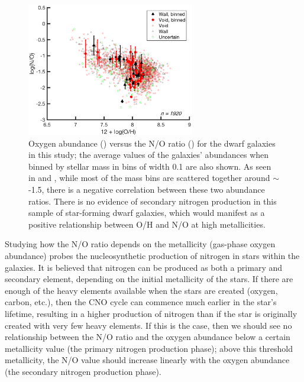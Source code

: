 \begin{figure}
    \centering
    \includegraphics[width=0.65\textwidth]{Images/Paper3/1sig_I06relations_dwarf_SF_t3_dust_NSA_Z12logOH_logNO_scatterMbin}
    \caption[O/H versus N/O for star-forming dwarf galaxies]{Oxygen abundance 
    (\OH) versus the N/O ratio (\NO) for the dwarf galaxies in this study; the 
    average values of the galaxies' abundances when binned by stellar mass in 
    bins of width 0.1 are also shown.  As seen in \cite{Andrews13} and 
    \cite{Douglass17b}, while most of the mass bins are scattered together 
    around \NO $\sim$-1.5, there is a negative correlation between these two 
    abundance ratios.  There is no evidence of secondary nitrogen production in 
    this sample of star-forming dwarf galaxies, which would manifest as a 
    positive relationship between O/H and N/O at high metallicities.}
    \label{fig:NOvOH}
\end{figure}

Studying how the N/O ratio depends on the metallicity (gas-phase oxygen 
abundance) probes the nucleosynthetic production of nitrogen in stars within the 
galaxies.  It is believed that nitrogen can be produced as both a primary and 
secondary element, depending on the initial metallicity of the stars.  If there 
are enough of the heavy elements available when the stars are created (oxygen, 
carbon, etc.), then the CNO cycle can commence much earlier in the star's 
lifetime, resulting in a higher production of nitrogen than if the star is 
originally created with very few heavy elements.  If this is the case, then we 
should see no relationship between the N/O ratio and the oxygen abundance below 
a certain metallicity value (the primary nitrogen production phase); above this 
threshold metallicity, the N/O value should increase linearly with the oxygen 
abundance (the secondary nitrogen production phase).

